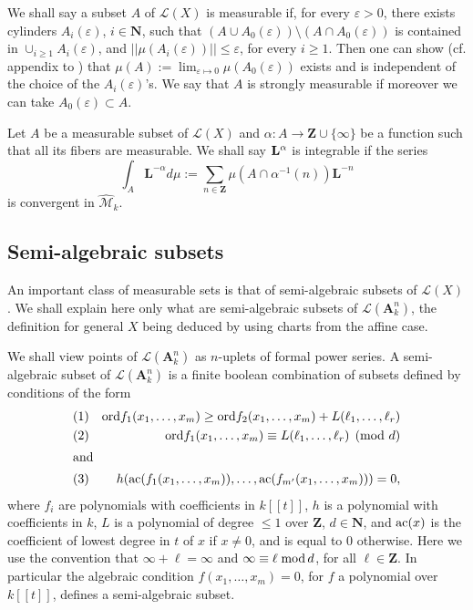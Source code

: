 \documentclass[english,12pt]{amsart}
\def\ac{{\rm ac}}
\def\AA{{\mathbf A}}
\def\LL{{\mathbf L}}
\def\NN{{\mathbf N}}
\def\ZZ{{\mathbf Z}}
\def\cL{{\mathcal L}}
\def\cM{{\mathcal M}}
\theoremstyle{definition}
\theoremstyle{remark}
\theoremstyle{plain}
\numberwithin{equation}{subsection}
\def\AA{{\mathbf A}}
\def\LL{{\mathbf L}}
\def\NN{{\mathbf N}}
\def\ZZ{{\mathbf Z}}
\def\cL{{\mathcal L}}
\def\cM{{\mathcal M}}
\def\ord{{\rm ord}}
\begin{document}
We shall say a subset $A$ of $\cL (X)$ is measurable
if, for every $\varepsilon >0$, there exists
cylinders $A_i (\varepsilon)$, $i \in \NN$,
such that $(A \cup A_0 (\varepsilon))
\setminus 
(A \cap A_0 (\varepsilon))$ is contained
in $\cup_{i \geq 1} A_i (\varepsilon)$,
and $\vert \vert \mu (A_i (\varepsilon)) \vert \vert \leq \varepsilon$,
for every $i \geq 1$.
Then one can show (cf. appendix to \cite{compositio}) that
$\mu (A) := \lim_{\varepsilon \mapsto 0} \mu (A_0 (\varepsilon))$
exists and is independent of the choice of the $A_i (\varepsilon)$'s.
We say that $A$ is strongly measurable
if moreover we can take $A_{0} (\varepsilon) \subset A$.


Let $A$ be a measurable subset of $\cL (X)$
and
$\alpha : A \rightarrow \ZZ \cup \{\infty\}$ 
be a function
such that all its fibers are measurable.
We shall say $\LL^{\-\alpha}$ is integrable
if the series
$$
\int_A \LL^{- \alpha} d \mu :=
\sum_{n \in \ZZ} \mu (A \cap \alpha^{-1} (n) ) \LL^{-n}
$$
is convergent in $\widehat \cM_k$.



\subsection{Semi-algebraic subsets}An important class
of measurable sets is that of semi-algebraic subsets of 
$\cL (X)$. We shall explain here only what are
semi-algebraic subsets of $\cL (\AA^n_k)$, the definition
for general $X$ being deduced by using charts
from the affine case.


We shall view points of $\cL (\AA^n_k)$ as $n$-uplets of formal power series.
A semi-algebraic subset
of $\cL (\AA^n_k)$ is a finite boolean combination of subsets
defined by
conditions of the form
\begin{align*}
\text{(1)}&&\ord f_1 (x_1, \ldots, x_m) \geq
\ord f_2 (x_1, \ldots, x_m) + L (\ell_1, \ldots, \ell_r)\\
\text{(2)}&&\ord f_1 (x_1, \ldots, x_m) \equiv
L (\ell_1, \ldots, \ell_r) \pmod d\\
\intertext{and}
\text{(3)}&&h (\ac (f_1 (x_1, \ldots, x_m)),
\ldots,
\ac (f_{m'} (x_1, \ldots, x_m))) = 0,
\end{align*}
where $f_i$ are polynomials with coefficients in  $k [[t]]$,
$h$ is a polynomial with coefficients in  $k$,
$L$ is a polynomial of degree $\leq 1$ over $\ZZ$, $d \in \NN$,
and $\ac (x)$ is the coefficient of lowest degree in $t$
of $x$ if $x \not= 0$, and is equal to 0 otherwise.
Here we use the convention that $\infty + \ell =  \infty$
and
$\infty \equiv \ell \; {\rm mod} \, d$, for all $\ell \in \ZZ$.
In particular the algebraic 
condition 
$f (x_1, \ldots, x_m) = 0$, for $f$ a
polynomial over $k [[t]]$, defines a semi-algebraic subset.
\end{document}
